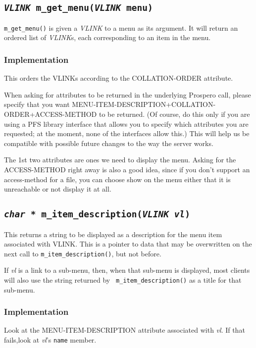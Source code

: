 \subsection{\tt {\it VLINK }m\_get\_menu({\it VLINK} menu)}

{\tt m\_get\_menu()} is given a {\it VLINK} to a menu as its argument.  
It will return an ordered list of {\it VLINK}s, each corresponding to
an item in the menu.

\subsubsection{Implementation} 

This orders the VLINKs according to the {\sc COLLATION-ORDER} attribute.

When asking for attributes to be returned in the underlying Prospero
call, please specify that you want
MENU-ITEM-DESCRIPTION+COLLATION-ORDER+ACCESS-METHOD to be returned.
(Of course, do this only if you are using a PFS library interface that
allows you to specify which attributes you are requested; at the
moment, none of the interfaces allow this.)
This will help us be compatible with possible future changes to the
way the server works.

The 1st two attributes are ones we need to display the menu.  Asking
for the ACCESS-METHOD right away is also a good idea, since if you
don't support an access-method for a file, you can choose show on the
menu either that it is unreachable or not display it at all.

\subsection{\tt {\it char *} m\_item\_description({\it VLINK vl})}

This returns a string to be displayed as a description for the menu item
associated with VLINK.  This is a pointer to data that may be
overwritten on the next call to {\tt m\_item\_description()}, but not before.

If {\it vl} is a link to a sub-menu,  then, when that sub-menu is
displayed, most clients will also use the string returned by {\tt
m\_item\_description()} as a title for that sub-menu.

\subsubsection{Implementation}

Look at the {\sc MENU-ITEM-DESCRIPTION} attribute associated with {\it
vl}.  If that fails,look at {\it vl}'s {\tt name} member. 

